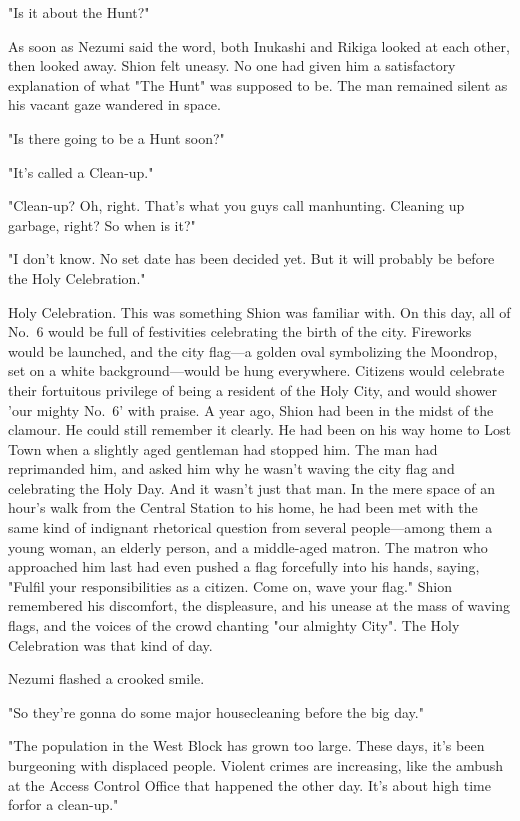 "Is it about the Hunt?"

As soon as Nezumi said the word, both Inukashi and Rikiga looked at each
other, then looked away. Shion felt uneasy. No one had given him a
satisfactory explanation of what "The Hunt" was supposed to be. The man
remained silent as his vacant gaze wandered in space.

"Is there going to be a Hunt soon?"

"It's called a Clean-up."

"Clean-up? Oh, right. That's what you guys call manhunting. Cleaning up
garbage, right? So when is it?"

"I don't know. No set date has been decided yet. But it will probably be
before the Holy Celebration."

Holy Celebration. This was something Shion was familiar with. On this
day, all of No.~6 would be full of festivities celebrating the birth of
the city. Fireworks would be launched, and the city flag---a golden oval
symbolizing the Moondrop, set on a white background---would be hung
everywhere. Citizens would celebrate their fortuitous privilege of being
a resident of the Holy City, and would shower 'our mighty No.~6' with
praise. A year ago, Shion had been in the midst of the clamour. He could
still remember it clearly. He had been on his way home to Lost Town when
a slightly aged gentleman had stopped him. The man had reprimanded him,
and asked him why he wasn't waving the city flag and celebrating the
Holy Day. And it wasn't just that man. In the mere space of an hour's
walk from the Central Station to his home, he had been met with the same
kind of indignant rhetorical question from several people---among them a
young woman, an elderly person, and a middle-aged matron. The matron who
approached him last had even pushed a flag forcefully into his hands,
saying, "Fulfil your responsibilities as a citizen. Come on, wave your
flag." Shion remembered his discomfort, the displeasure, and his unease
at the mass of waving flags, and the voices of the crowd chanting "our
almighty City". The Holy Celebration was that kind of day.

Nezumi flashed a crooked smile.

"So they're gonna do some major housecleaning before the big day."

"The population in the West Block has grown too large. These days, it's
been burgeoning with displaced people. Violent crimes are increasing,
like the ambush at the Access Control Office that happened the other
day. It's about high time for\el for a clean-up."


